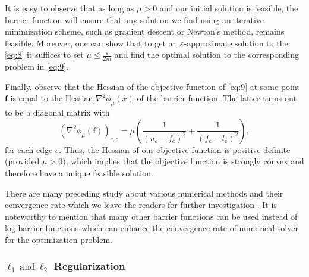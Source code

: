 \documentclass{article} %
\theoremstyle{bfnote}
\begin{document}
%


It is easy to observe that as long as $\mu>0$ and our initial solution is feasible, the barrier function will ensure that any solution we find using an iterative minimization scheme, such as gradient descent or Newton's method, remains feasible. Moreover, one can show that to get an $\varepsilon$-approximate solution to the \cref{eq:8} it suffices to set $\mu \leq \frac{\varepsilon}{2 m}$ and find the optimal solution to the corresponding problem in \cref{eq:9}.

Finally, observe that the Hessian of the objective function of \cref{eq:9} at some point $\bm{f}$ is equal to the Hessian $\nabla^2 \phi_\mu(x)$ of the barrier function. The latter turns out to be a diagonal matrix with
\begin{equation*}
	\left(\nabla^2 \phi_\mu(\bm{f})\right)_{e, e}=\mu\left(\frac{1}{\left(u_e-f_e\right)^2}+\frac{1}{\left(f_e-l_e\right)^2}\right),
\end{equation*}
for each edge $e$. Thus, the Hessian of our objective function is positive definite (provided $\mu>0)$, which implies that the objective function is strongly convex and therefore have a unique feasible solution.

There are many preceding study about various numerical methods and their convergence rate which we leave the readers for further investigation \citep{bertsimas1997, boyd2004, bubeck2015}. It is noteworthy to mention that many other barrier functions can be used instead of log-barrier functions which can enhance the convergence rate of numerical solver for the optimization problem. \citep{cohen2020, lee2020, axiotis2022, brand2021c, chen2022a}

\subsubsection{$\ell_1 \hspace{2pt }\text{and}  \hspace{2pt}  \ell_2$ Regularization}
\end{document}
